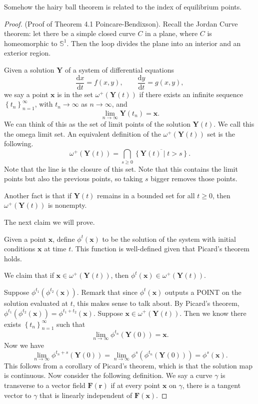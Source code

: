 Somehow the hairy ball theorem is related to the index of equilibrium points.
\begin{proof}
	(Proof of Theorem 4.1 Poincare-Bendixson). Recall the Jordan Curve theorem: let there be a simple closed curve $C$ in a plane, where $C$ is homeomorphic to $\mathbb{S}^1$. Then the loop divides the plane into an interior and an exterior region.

	Given a solution $\mathbf{Y}$ of a system of differential equations 
	\[
		\frac{\mathrm{d}x}{\mathrm{d}t} =f(x,y),\qquad \frac{\mathrm{d}y}{\mathrm{d}t} =g(x,y)
	,\]
	we say a point $\mathbf{x}$ is in the set $\omega^+(\mathbf{Y}(t))$ if there exists an infinite sequence $\left\{ t_n \right\}_{n=1}^\infty$, with $t_n\to \infty$ as $n\to \infty$, and
	\[
		\lim_{n \to \infty} \mathbf{Y}(t_n)=\mathbf{x}
	.\]
	We can think of this as the set of limit points of the solution $\mathbf{Y}(t)$. We call this the omega limit set. An equivalent definition of the $\omega^+(\mathbf{Y}(t))$ set is the following.
	\[
		\omega^+(\mathbf{Y}(t))=\bigcap_{s\geq 0} \overline{\left\{ \mathbf{Y}(t) \mid t>s \right\}  }
	.\]
	Note that the line is the closure of this set. Note that this contains the limit points but also the previous points, so taking $s$ bigger removes those points.

	Another fact is that if $\mathbf{Y}(t)$ remains in a bounded set for all $t\geq 0$, then $\omega ^+(\mathbf{Y}(t))$ is nonempty.

	The next claim we will prove.
	\begin{notation}
		Given a point $\mathbf{x}$, define $\phi ^t(\mathbf{x})$ to be the solution of the system with initial conditions $\mathbf{x}$ at time $t$. This function is well-defined given that Picard's theorem holds.
	\end{notation}

	We claim that if $\mathbf{x}\in \omega ^+(\mathbf{Y}(t))$, then $\phi ^t(\mathbf{x})\in \omega ^+(\mathbf{Y}(t))$.

	Suppose $\phi^{t_1}\left( \phi ^{t_2}(\mathbf{x}) \right) $. Remark that since $\phi ^{t}(\mathbf{x})$ outputs a POINT on the solution evaluated at $t$, this makes sense to talk about. By Picard's theorem, $\phi ^{t_1}\left( \phi ^{t_2}\left( \mathbf{x} \right)  \right) =\phi ^{t_1+t_2}\left( \mathbf{x} \right) $. Suppose $\mathbf{x}\in\omega^+(\mathbf{Y}(t))$. Then we know there exists $\left\{ t_n \right\}_{n=1}^{\infty}$ such that
	\[
		\lim_{n \to \infty} \phi ^{t_n}(\mathbf{Y}(0))=\mathbf{x}
	.\]
	Now we have
	\[
		\lim_{n \to \infty} \phi ^{t_n+s}\left( \mathbf{Y}(0) \right) =\lim_{n \to \infty} \phi ^{s}\left( \phi ^{t_n}\left( \mathbf{Y}(0) \right)  \right) =\phi^s(\mathbf{x})
	.\]
	This follows from a corollary of Picard's theorem, which is that the solution map is continuous. Now consider the following definition. We say a curve $\gamma $ is transverse to a vector field $\mathbf{F}(\mathbf{r})$ if at every point $\mathbf{x}$ on $\gamma $, there is a tangent vector to $\gamma $ that is linearly independent of $\mathbf{F}(\mathbf{x})$.


\end{proof}
